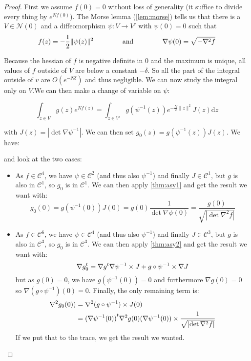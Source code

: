 \documentclass[10pt]{report}
\theoremstyle{plain}
\theoremstyle{definition}
\theoremstyle{remark}
\newcommand{\dd}{\mathrm{d}}
\newcommand{\class}[1]{{\mathscr{C}^{#1}}}
\newcommand{\gap}{\hspace{1.5cm}}
\begin{document}
\begin{proof}
First we assume $f(0) = 0$ without loss of generality (it suffice to divide every
thing by $e^{Nf(0)}$). The Morse lemma (\ref{lem:morse}) tells us that there is
a $V \in \mathcal{N}(0)$ and
a diffeomorphism $\psi : V \to V'$ with $\psi(0) = 0$ such that
\[f(z) = - \frac12 \|\psi(z)\|^2 \gap \text{and}\gap \nabla \psi(0) =
  \sqrt{-\nabla^2 f}\]

Because the hessian of $f$ is negative definite in 0 and the maximum is unique,
all values of $f$ outside of $V$ are below a
constant $-\delta$. So all the part of the integral outside of $v$ are
$O(e^{-N\delta})$ and thus negligible. We can now study the integral only on $V$.We can then make a change of variable on $\psi$:

\[\int_{z \in V} g(z)e^{Nf(z)} = \int_{z \in V'}
  g(\psi^{-1}(z))e^{-\frac N2\|z\|^2} J(z) \dd z\]

with $J(z) = |\det{\nabla \psi^{-1}}|$. We can then set $g_0(z) =
g(\psi^{-1}(z))J(z)$. We have:


and look at the two cases:
\begin{itemize}
  \item As $f \in \class 4$, we have $\psi \in \class 2$ (and thus also
    $\psi^{-1}$) and finally $J \in \class 1$, but $g$ is also in $\class 1$, so
    $g_0$ is in $\class 1$. We can then apply \cref{thm:asy1} and get the result
    we want with:
\[g_0(0) = g(\psi^{-1}(0))J(0) = g(0)\frac 1 {\det {\nabla \psi(0)}} =
  \frac {g(0)}{\sqrt{\left|\det \nabla^2 f\right|}}
  \]


  \item As $f \in \class 6$, we have $\psi \in \class 4$ (and thus also
    $\psi^{-1}$) and finally $J \in \class 3$, but $g$ is also in $\class 3$, so
    $g_0$ is in $\class 3$. We can then apply \cref{thm:asy2} and get the result
    we want with:
    \[\nabla g_0^t = \nabla g^t \nabla \psi^{-1} \times J + g \circ \psi^{-1}
      \times \nabla J\]
    but as $g(0) = 0$, we have $g(\psi^{-1}(0)) = 0$ and furthermore $\nabla
    g(0) = 0$ so $\nabla (g \circ \psi^{-1})(0) = 0$. Finally, the only remaining term is:
    \begin{align*}
      \nabla^2 g_0(0))
      &= \nabla^2 (g \circ \psi^{-1}) \times J(0)\\
      &= {(\nabla \psi^{-1}(0))}^t\nabla^2 g(0) {(\nabla \psi^{-1}(0))} \times
         \frac {1}{\sqrt{\left|\det \nabla^2 f\right|}}
    \end{align*}
    If we put that to the trace, we get the result we wanted.

\end{itemize}

\end{proof}
\end{document}
